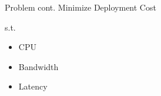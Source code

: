 \begin{frame}{Problem cont.}
    Minimize Deployment Cost

    s.t.
    \begin{itemize}
        \item CPU
        \item Bandwidth
        \item Latency
    \end{itemize}
\end{frame}